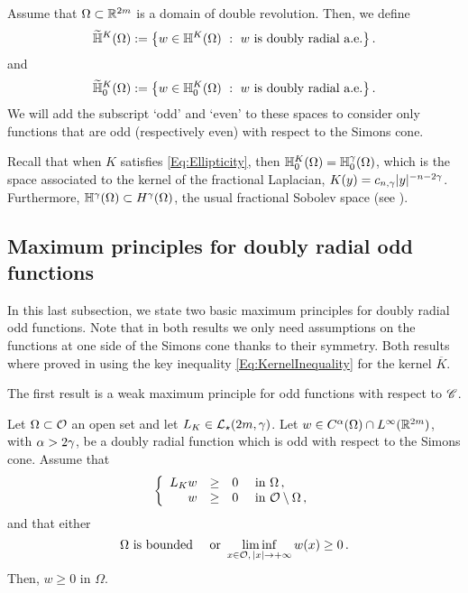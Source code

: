 Assume that $\Omega \subset \mathbb{R}^{2m}$ is a domain of double revolution. Then, we define
$$
\widetilde{\mathbb{H}}^K(\Omega) := \left \{ w \in \mathbb{H}^K(\Omega) \ : \ w \textrm{ is doubly radial a.e.} \right \}.
$$
and
$$
\widetilde{\mathbb{H}}^K_0(\Omega) := \left \{ w \in \mathbb{H}^K_0(\Omega) \ : \ w \textrm{ is doubly radial a.e.} \right \}.
$$
We will add the subscript `odd' and `even' to these spaces to consider only functions that are odd (respectively even) with respect to the Simons cone.

Recall that when $K$ satisfies \eqref{Eq:Ellipticity}, then $\mathbb{H}^K_0 (\Omega) = \mathbb{H}^\gamma_0 (\Omega)$, which is the space associated to the kernel of the fractional Laplacian, $K(y) = c_{n,\gamma}|y|^{-n-2\gamma}$. Furthermore, $\mathbb{H}^\gamma(\Omega) \subset H^\gamma(\Omega)$, the usual fractional Sobolev space (see \cite{HitchhikerGuide,CozziPassalacqua}). 


\subsection{Maximum principles for doubly radial odd functions}
\label{Subsec:MaxPrinciples}

In this last subsection, we state two basic maximum principles for doubly radial odd functions. Note that in both results we only need assumptions on the functions at one side of the Simons cone thanks to their symmetry. Both results where proved in \cite{FelipeSanz-Perela:IntegroDifferentialI} using the key inequality \eqref{Eq:KernelInequality} for the kernel $\overline{K}$.

The first result is a weak maximum principle for odd functions with respect to $\mathscr{C}$.

\begin{proposition}
	\label{Prop:WeakMaximumPrincipleForOddFunctions} Let $\Omega \subset \mathcal{O}$ an open set and let $L_K  \in \mathcal{L}_\star (2m,  \gamma)$.  Let $w\in C^{\alpha}(\Omega)\cap L^\infty(\mathbb{R}^{2m})$, with $\alpha > 2\gamma$, be a doubly radial function which is odd with respect to the Simons cone. Assume that
	$$
	\left\{\begin{array}{rcll}
	L_K w & \geq & 0 & \text{ in } \Omega\,,\\
	w & \geq & 0 & \text{ in } \mathcal{O} \setminus \Omega\,,
	\end{array} \right.
	$$
	and that either
	$$
	\Omega \text{ is bounded} \quad \text{ or } \liminf_{x \in \mathcal{O},\,|x|\to +\infty} w(x) \geq 0\,.
	$$
	Then, $w \geq 0$ in $\Omega$.
\end{proposition}


